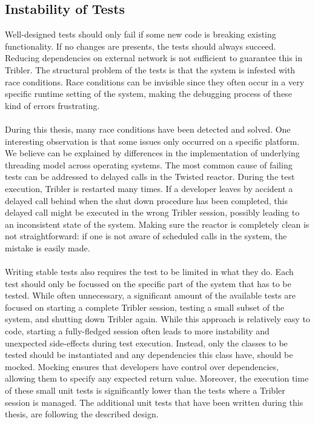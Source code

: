 \subsection{Instability of Tests}
Well-designed tests should only fail if some new code is breaking existing functionality. If no changes are presents, the tests should always succeed. Reducing dependencies on external network is not sufficient to guarantee this in Tribler. The structural problem of the tests is that the system is infested with race conditions. Race conditions can be invisible since they often occur in a very specific runtime setting of the system, making the debugging process of these kind of errors frustrating.\\\\
During this thesis, many race conditions have been detected and solved. One interesting observation is that some issues only occurred on a specific platform. We believe can be explained by differences in the implementation of underlying threading model across operating systems. The most common cause of failing tests can be addressed to delayed calls in the Twisted reactor. During the test execution, Tribler is restarted many times. If a developer leaves by accident a delayed call behind when the shut down procedure has been completed, this delayed call might be executed in the wrong Tribler session, possibly leading to an inconsistent state of the system. Making sure the reactor is completely clean is not straightforward: if one is not aware of scheduled calls in the system, the mistake is easily made.\\\\
Writing stable tests also requires the test to be limited in what they do. Each test should only be focussed on the specific part of the system that has to be tested. While often unnecessary, a significant amount of the available tests are focused on starting a complete Tribler session, testing a small subset of the system, and shutting down Tribler again. While this approach is relatively easy to code, starting a fully-fledged session often leads to more instability and unexpected side-effects during test execution. Instead, only the classes to be tested should be instantiated and any dependencies this class have, should be mocked. Mocking ensures that developers have control over dependencies, allowing them to specify any expected return value. Moreover, the execution time of these small unit tests is significantly lower than the tests where a Tribler session is managed. The additional unit tests that have been written during this thesis, are following the described design.

